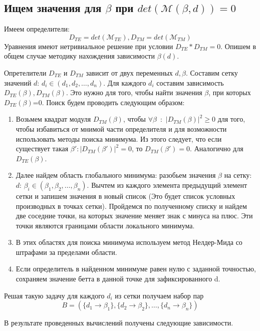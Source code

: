 \documentclass{article}
\begin{document}
\subsection{Ищем значения для $\beta$ при $det(\mathcal{M}(\beta, d)) = 0$ }

Имеем определители: $$D_{TE} = det(\mathcal{M}_{TE}), D_{TM} = det(\mathcal{M}_{TM})$$
Уравнения имеют нетривиальное решение при условии $D_{TE} * D_{TM} = 0$. Опишем в общем случае методику нахождения зависимости $\beta(d)$.
\par Опретелители $D_{TE}$ и $D_{TM}$ зависит от двух переменных $d, \beta$. Составим сетку значений $d$: $d_i \in (d_1, d_2, \ldots, d_n)$. Для каждого $d_i$ составим зависимость $D_{TE}(\beta), D_{TM}(\beta)$. Это нужно для того, чтобы найти значения $\beta$, при которых $D_{TE}(\beta)$=0. Поиск будем проводить следующим образом: \begin{enumerate}
    \item Возьмем квадрат модуля $D_{TM}(\beta)$, чтобы  $\forall \beta$~:~$|D_{TM}(\beta)|^2 \geq 0$ для того, чтобы избавиться от мнимой части определителя и для возможности использовать методы поиска минимума. Из этого следует, что если существует такая $\beta': |D_{TM}(\beta')|^2 = 0 $, то $ D_{TM}(\beta') = 0$. Аналогично для $D_{TE}(\beta)$.
    \item Далее найдем область глобального минимума: разобьем значения $\beta$ на сетку: $d$: $\beta_i \in (\beta_1, \beta_2, \ldots, \beta_n)$. Вычтем из каждого элемента предыдущий элемент сетки и запишем значения в новый список (Это будет список условных производных в точках сетки). Пройдемся по полученному списку и найдем две соседние точки, на которых значение меняет знак с минуса на плюс. Эти точки являются границами области локального минимума.   
    \item В этих областях для поиска  минимума используем метод Нелдер-Мида со штрафами за пределами области.
    \item Если определитель в найденном минимуме равен нулю с заданной точностью, сохраняем значение бетта в данной точке для зафиксированного d. 
\end{enumerate}

Решая такую задачу для каждого $d_i$ из сетки получаем набор пар $$B = \left( \{d_1 \to \beta_1\}, \{d_2 \to \beta_2\}, \ldots, \{d_n \to \beta_n\}  \right )$$

В результате проведенных вычислений получены следующие зависимости.
\end{document}
